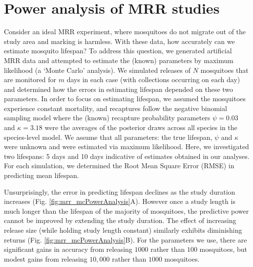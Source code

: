 \documentclass[12pt]{article}
\begin{document}
\section{Power analysis of MRR studies}
Consider an ideal MRR experiment, where mosquitoes do not migrate out of the study area and marking is harmless. With these data, how accurately can we estimate mosquito lifespan? To address this question, we generated artificial MRR data and attempted to estimate the (known) parameters by maximum likelihood (a `Monte Carlo' analysis). We simulated releases of $N$ mosquitoes that are monitored for $m$ days in each case (with collections occurring on each day) and determined how the errors in estimating lifespan depended on these two parameters. In order to focus on estimating lifespan, we assumed the mosquitoes experience constant mortality, and recaptures follow the negative binomial sampling model where the (known) recapture probability parameters $\psi=0.03$ and $\kappa=3.18$ were the averages of the posterior draws across all species in the species-level model. We assume that all parameters: the true lifespan, $\psi$ and $\kappa$ were unknown and were estimated via maximum likelihood. Here, we investigated two lifespans: 5 days and 10 days indicative of estimates obtained in our analyses. For each simulation, we determined the Root Mean Square Error (RMSE) in predicting mean lifespan.

Unsurprisingly, the error in predicting lifespan declines as the study duration increases (Fig. \ref{fig:mrr_mcPowerAnalysis}A). However once a study length is much longer than the lifespan of the majority of mosquitoes, the predictive power cannot be improved by extending the study duration. The effect of increasing release size (while holding study length constant) similarly exhibits diminishing returns (Fig. \ref{fig:mrr_mcPowerAnalysis}B). For the parameters we use, there are significant gains in accuracy from releasing $1000$ rather than $100$ mosquitoes, but modest gains from releasing $10,000$ rather than $1000$ mosquitoes.
\end{document}
